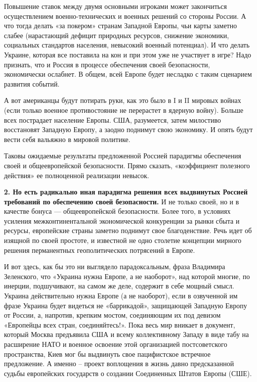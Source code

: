 Повышение ставок между двумя основными игроками может закончиться
осуществлением военно-технических и военных решений со стороны России. А что
тогда делать «за покером» странам Западной Европы, чьи карты заметно слабее
(нарастающий дефицит природных ресурсов, снижение экономики, социальных
стандартов населения, невысокий военный потенциал). И что делать Украине,
которая все поставила на кон и при этом уже не участвует в игре? Надо признать,
что и Россия в процессе обеспечения своей безопасности, экономически ослабнет.
В общем, всей Европе будет несладко с таким сценарием развития событий.

А вот американцы будут потирать руки, как это было в I и II мировых войнах
(если только военное противостояние не перерастет в ядерную войну). Больше всех
пострадает население Европы. США, разумеется, затем милостиво восстановят
Западную Европу, а заодно поднимут свою экономику. И опять будут вести себя
вальяжно в мировой политике.

Таковы ожидаемые результаты предложенной Россией парадигмы обеспечения своей и
общеевропейской безопасности. Прямо сказать, «коэффициент полезного действия»
ее полноценной реализации невысок.

\textbf{2. Но есть радикально иная парадигма решения всех выдвинутых Россией требований
по обеспечению своей безопасности.} И не только своей, но и в качестве бонуса —
общеевропейской безопасности. Более того, в условиях усиления
межконтинентальной экономической конкуренции за рынки сбыта и ресурсы,
европейские страны заметно поднимут свое благоденствие. Речь идет об изящной по
своей простоте, и известной не одно столетие концепции мирного решения
перманентных геополитических потрясений в Европе.

И вот здесь, как бы это ни выглядело парадоксальным, фраза Владимира
Зеленского, что «Украина нужна Европе, а не наоборот», над которой многие, по
инерции, подшучивают, на самом же деле, содержит в себе мощный смысл. Украина
действительно нужна Европе (а не наоборот), если в озвученной им фразе Украина
будет видеться не «баррикадой», защищающей Западную Европу от России, а,
напротив, крепким мостом, соединяющим их под девизом «Европейцы всех стран,
соединяйтесь!». Пока весь мир вникает в документ, который Москва предъявила США
и всему коллективному Западу в виде табу на расширение НАТО и военное освоение
этой организацией постсоветского пространства, Киев мог бы выдвинуть свое
пацифистское встречное предложение. А именно – проект воплощения в жизнь давно
предсказанной судьбы европейских государств о создании Соединенных Штатов
Европы (СШЕ).

